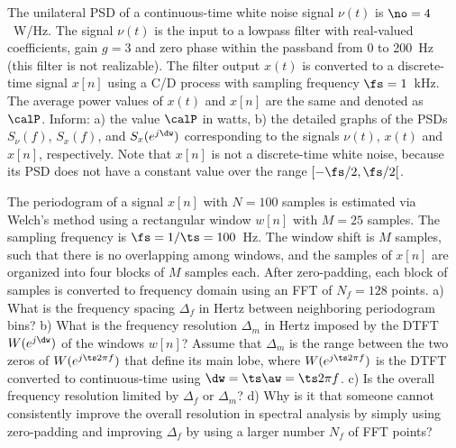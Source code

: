 \begin{exercises}
\item The unilateral PSD of a continuous-time white noise signal $\nu(t)$ is $\no=4$~W/Hz. The signal $\nu(t)$ is the input to a lowpass filter with real-valued coefficients, gain $g=3$ and zero phase within the passband from 0 to 200~Hz (this filter is not realizable). The filter output $x(t)$ is converted to a discrete-time signal $x[n]$ using a C/D process with sampling frequency $\fs=1$~kHz. The average power values of $x(t)$ and $x[n]$ are the same and denoted as $\calP$. Inform: a) the value $\calP$ in watts, b) the detailed graphs of the PSDs $S_{\nu}(f)$, $S_{x}(f)$, and $S_x(e^{j\dw})$ corresponding to the signals $\nu(t)$, $x(t)$ and $x[n]$, respectively. Note that $x[n]$ is not a discrete-time white noise, because its PSD does not have a constant value over the range $[-\fs/2, \fs/2[$.

\item The periodogram of a signal $x[n]$ with $N=100$ samples is estimated via Welch's method using a rectangular window $w[n]$ with $M=25$ samples. The sampling frequency is $\fs=1/\ts=100$~Hz. The window shift is $M$ samples, such that there is no overlapping among windows, and the samples of $x[n]$ are organized into four blocks of $M$ samples each. After zero-padding, each block of samples is converted to frequency domain using an FFT of $N_f=128$ points. a) What is the frequency spacing $\Delta_f$ in Hertz between neighboring periodogram bins? b) What is the frequency resolution $\Delta_m$ in Hertz imposed by the DTFT $W(e^{j\dw})$ of the windows $w[n]$? Assume that $\Delta_m$ is the range between the two zeros of $W(e^{j\ts 2 \pi f})$ that define its main lobe, where $W(e^{j\ts 2 \pi f})$ is the DTFT converted to continuous-time using $\dw=\ts \aw= \ts 2 \pi f$.  c) Is the overall frequency resolution limited by $\Delta_f$ or $\Delta_m$? d) Why is it that someone cannot consistently improve the overall resolution in spectral analysis by simply using zero-padding and improving $\Delta_f$ by using a larger number $N_f$ of FFT points?

\end{exercises}

